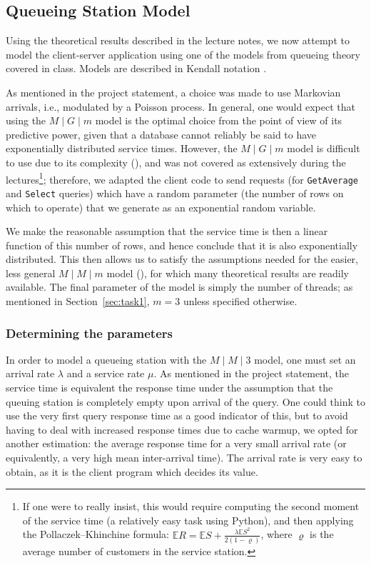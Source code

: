 \documentclass[journal]{IEEEtran}
\theoremstyle{definition}
\newcommand{\java}[1]{\texttt{#1}}
\renewcommand{\rho}{\varrho}
\begin{document}
\subsection{Queueing Station Model}
Using the theoretical results described in the lecture notes, we now attempt to model the client-server application using one of the models from queueing theory covered in class.
Models are described in Kendall notation \cite{kendall}.

As mentioned in the project statement, a choice was made to use Markovian arrivals, i.e., modulated by a Poisson process.
In general, one would expect that using the  \(M \mid G \mid m\) model is the optimal choice from the point of view of its predictive power, given that a database cannot reliably be said to have exponentially distributed service times.
However, the \(M \mid G \mid m\) model is difficult to use due to its complexity (\cite{mgm}), and was not covered as extensively during the lectures\footnote{If one were to really insist, this would require computing the second moment of the service time (a relatively easy task using Python), and then applying the Pollaczek--Khinchine formula: \(\mathbb{E}R = \mathbb{E}S + \frac{\lambda \mathbb{E}S^2}{2(1-\rho)}\), where \(\rho\) is the average number of customers in the service station.}; therefore, we adapted the client code to send requests (for \java{GetAverage} and \java{Select} queries) which have a random parameter (the number of rows on which to operate) that we generate as an exponential random variable.

We make the reasonable assumption that the service time is then a linear function of this number of rows, and hence conclude that it is also exponentially distributed.
This then allows us to satisfy the assumptions needed for the easier, less general \(M \mid M \mid m\) model (\cite{kendall}), for which many theoretical results are readily available.
The final parameter of the model is simply the number of threads; as mentioned in Section~\ref{sec:task1}, \(m=3\) unless specified otherwise.

\subsubsection{Determining the parameters}
In order to model a queueing station with the \(M \mid M \mid 3\) model, one must set an arrival rate \(\lambda\) and a service rate \(\mu\).
As mentioned in the project statement, the service time is equivalent the response time under the assumption that the queuing station is completely empty upon arrival of the query.
One could think to use the very first query response time as a good indicator of this, but to avoid having to deal with increased response times due to cache warmup, we opted for another estimation: the average response time for a very small arrival rate (or equivalently, a very high mean inter-arrival time).
The arrival rate is very easy to obtain, as it is the client program which decides its value.
\end{document}

